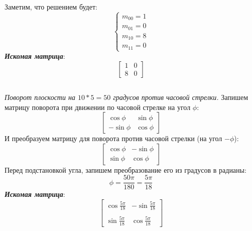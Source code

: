\documentclass[a5paper, 10pt]{article}
\theoremstyle{definition}
\theoremstyle{plain}
\theoremstyle{remark}
\begin{document}
Заметим, что решением будет: 
\begin{equation}
\begin{cases}
m_{0 0} = 1\\
m_{0 1} = 0\\
m_{1 0} = 8\\
m_{1 1} = 0
\end{cases}
\end{equation}
\textit{\textbf{Искомая матрица}}:
\begin{equation}
\begin{bmatrix}
1 & 0\\
8 & 0
\end{bmatrix}
\end{equation}

\newpage
\subsection{}
\textit{Поворот плоскости на $10 * 5 = 50$ градусов против часовой стрелки.}
Запишем матрицу поворота при движении по часовой стрелке на угол $\phi$:
\begin{equation}
\begin{bmatrix}
\cos \phi & \sin \phi \\
-\sin \phi & \cos \phi
\end{bmatrix}
\end{equation}
И преобразуем матрицу для поворота против часовой стрелки (на угол $-\phi$):
\begin{equation}
\begin{bmatrix}
\cos \phi & -\sin \phi \\
\sin \phi & \cos \phi
\end{bmatrix}
\end{equation}
Перед подстановкой угла, запишем преобразование его из градусов в радианы:
\begin{equation}
\phi = \frac{50\pi}{180} =  \frac{5\pi}{18}
\end{equation}
\textit{\textbf{Искомая матрица}}:
\begin{equation}
\begin{bmatrix}
\cos  \frac{5\pi}{18} & -\sin  \frac{5\pi}{18} \\
\\
\sin  \frac{5\pi}{18} & \cos  \frac{5\pi}{18}
\end{bmatrix}
\end{equation}
\end{document}
